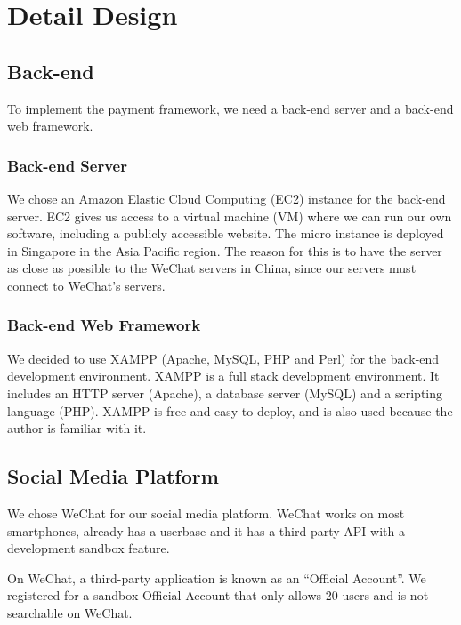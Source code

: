 \chapter{Detail Design}
\label{chp:Detail Design}


\section{Back-end}

To implement the payment framework, we need a back-end server and a back-end web framework. 

\subsection{Back-end Server}

We chose an Amazon Elastic Cloud Computing (EC2) instance for the back-end server. EC2 gives us access to a virtual machine (VM) where we can run our own software, including a publicly accessible website. The micro instance is deployed in Singapore in the Asia Pacific region. The reason for this is to have the server as close as possible to the WeChat servers in China, since our servers must connect to WeChat's servers.

\subsection{Back-end Web Framework}
\label{sct:web_framework}
We decided to use XAMPP (Apache, MySQL, PHP and Perl) for the back-end development environment. XAMPP is a full stack development environment. It includes an HTTP server (Apache), a database server (MySQL) and a scripting language (PHP). XAMPP is free and easy to deploy, and is also used because the author is familiar with it.

\section{Social Media Platform}

We chose WeChat for our social media platform. WeChat works on most smartphones, already has a userbase and it has a third-party API with a development sandbox feature. 

On WeChat, a third-party application is known as an ``Official Account''. We registered for a sandbox Official Account that only allows 20 users and is not searchable on WeChat.

